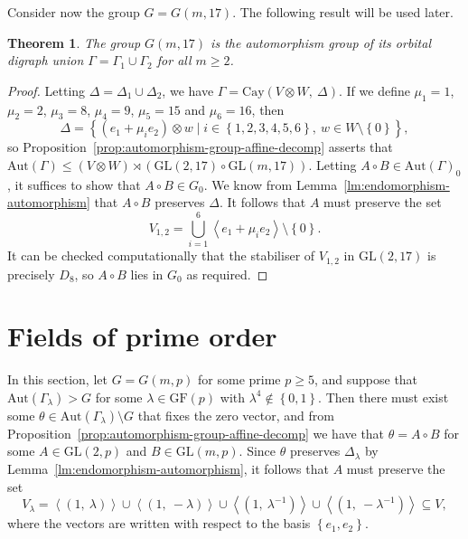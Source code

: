 \documentclass[10pt]{amsart}
\theoremstyle{definition}
\theoremstyle{plain}
\theoremstyle{plain}
\theoremstyle{plain}
\newtheorem{theorem}[theorem]{Theorem}
\theoremstyle{plain}
\newcommand{\Aut}{\mathrm{Aut}}
\newcommand{\Cay}{\mathrm{Cay}}
\newcommand{\GF}{\mathrm{GF}}
\newcommand{\GL}{\mathrm{GL}}
\begin{document}
Consider now the group $G = G{\left(m, 17 \right)}$. The following result will be used later.

\begin{theorem} \label{thm:q=17}
The group $G{\left(m, 17 \right)}$ is the automorphism group of its orbital digraph union $\Gamma = \Gamma_1 \cup \Gamma_2$ for all $m \geqslant 2$.
\end{theorem}
\begin{proof}
Letting $\Delta = \Delta_1 \cup \Delta_2$, we have $\Gamma = \Cay{\left(V \otimes W,\ \Delta \right)}$. If we define $\mu_1 = 1$, $\mu_2 = 2$, $\mu_3 = 8$, $\mu_4 = 9$, $\mu_5 = 15$ and $\mu_6 = 16$, then
\begin{displaymath}
    \Delta = {\left\{\left(e_1 + \mu_i e_2 \right) \otimes w \mid i \in {\left\{1, 2, 3, 4, 5, 6 \right\}},\ w \in W \setminus \left\{0 \right\}\right\}},
\end{displaymath}
so Proposition~\ref{prop:automorphism-group-affine-decomp} asserts that $\Aut{\left(\Gamma \right)} \leqslant \left(V \otimes W \right) \rtimes \left(\GL{\left(2, 17 \right)} \circ \GL{\left(m, 17 \right)}\right)$. Letting $A \circ B \in \Aut{\left(\Gamma \right)}_0$, it suffices to show that $A \circ B \in G_0$. We know from Lemma~\ref{lm:endomorphism-automorphism} that $A \circ B$ preserves $\Delta$. It follows that $A$ must preserve the set
\begin{displaymath}
    V_{1,2} = \bigcup_{i=1}^6 \left<e_1 + \mu_i e_2 \right> \setminus {\left\{0 \right\}}.
\end{displaymath}
It can be checked computationally that the stabiliser of $V_{1,2}$ in $\GL{\left(2, 17 \right)}$ is precisely $D_8$, so $A \circ B$ lies in $G_0$ as required.
\end{proof}

\section{Fields of prime order}

In this section, let $G = G{\left(m, p \right)}$ for some prime $p \geqslant 5$, and suppose that $\Aut{\left(\Gamma_\lambda \right)} > G$ for some $\lambda \in \GF{\left(p \right)}$ with $\lambda^4 \notin \left\{0, 1 \right\}$. Then there must exist some $\theta \in \Aut{\left(\Gamma_\lambda \right)} \setminus G$ that fixes the zero vector, and from Proposition~\ref{prop:automorphism-group-affine-decomp} we have that $\theta = A \circ B$ for some $A \in \GL{\left(2, p \right)}$ and $B \in \GL{\left(m, p \right)}$. Since $\theta$ preserves $\Delta_\lambda$ by Lemma~\ref{lm:endomorphism-automorphism}, it follows that $A$ must preserve the set
\begin{displaymath}
V_\lambda = \left<\left(1,\ \lambda \right)\right> \cup \left<\left(1,\ -\lambda \right)\right> \cup \left<\left(1,\ \lambda^{-1} \right)\right> \cup \left<\left(1,\ -\lambda^{-1} \right)\right> \subseteq V,
\end{displaymath}
where the vectors are written with respect to the basis $\left\{e_1, e_2 \right\}$.
\end{document}
